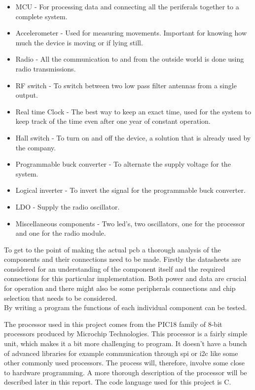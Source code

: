 \begin{itemize}[noitemsep]
	\item MCU - For processing data and connecting all the periferals together to a complete system.
	\item Accelerometer - Used for measuring movements. Important for knowing how much the device is moving or if lying still.
	\item Radio - All the communication to and from the outside world is done using radio transmissions. 
	\item RF switch - To switch between two low pass filter antennas from a single output.
	\item Real time Clock - The best way to keep an exact time, used for the system to keep track of the time even after one year of constant operation. 
	\item Hall switch - To turn on and off the device, a solution that is already used by the company.
	\item Programmable buck converter - To alternate the supply voltage for the system. 
	\item Logical inverter - To invert the signal for the programmable buck converter.
	\item LDO - Supply the radio oscillator.
	\item Miscellaneous components - Two \gls{led}'s, two oscillators, one for the processor and one for the radio module.
\end{itemize}


To get to the point of making the actual \gls{pcb} a thorough analysis of the components and their connections need to be made. Firstly the datasheets are considered for an understanding of the component itself and the required connections for this particular implementation. Both power and data are crucial for operation and there might also be some peripherals connections and chip selection that needs to be considered. \\
By writing a program the functions of each individual component can be tested. 

The processor used in this project comes from the PIC18 family of 8-bit processors produced by Microchip Technologies. This processor is a fairly simple unit, which makes it a bit more challenging to program. It doesn't have a bunch of advanced libraries for example communication through \gls{spi} or \gls{i2c} like some other commonly used processors. The process will, therefore, involve some close to hardware programming. A more thorough description of the processor will be described later in this report. The code language used for this project is C.

\begin{comment}
In some cases the component needs to be initialized in a specific way or it needs some other special attention which might require additional connections than it firstly seemed.
With all the specified components connected together a program is made to show all the functions and that they work as intended. 
To ensure that each component on the \gls{pcb} works and the prototype can be handed over to the software developers for a more advanced and optimized program. 
\end{comment}

